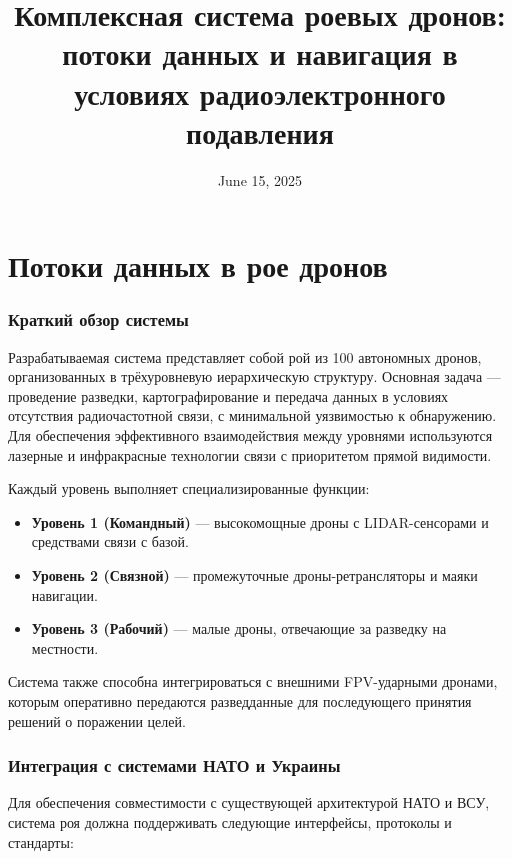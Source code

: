 \documentclass[12pt]{article}
\title{Комплексная система роевых дронов: потоки данных и навигация в условиях радиоэлектронного подавления}
\author{}
\date{June 15, 2025}
\begin{document}
\maketitle

\tableofcontents
\newpage

\part{Потоки данных в рое дронов}

\section{Краткий обзор системы}

Разрабатываемая система представляет собой рой из 100 автономных дронов, организованных в трёхуровневую иерархическую структуру. Основная задача --- проведение разведки, картографирование и передача данных в условиях отсутствия радиочастотной связи, с минимальной уязвимостью к обнаружению. Для обеспечения эффективного взаимодействия между уровнями используются лазерные и инфракрасные технологии связи с приоритетом прямой видимости. 

Каждый уровень выполняет специализированные функции:
\begin{itemize}
    \item \textbf{Уровень 1 (Командный)} --- высокомощные дроны с LIDAR-сенсорами и средствами связи с базой.
    \item \textbf{Уровень 2 (Связной)} --- промежуточные дроны-ретрансляторы и маяки навигации.
    \item \textbf{Уровень 3 (Рабочий)} --- малые дроны, отвечающие за разведку на местности.
\end{itemize}

Система также способна интегрироваться с внешними FPV-ударными дронами, которым оперативно передаются разведданные для последующего принятия решений о поражении целей.

\section{Интеграция с системами НАТО и Украины}

Для обеспечения совместимости с существующей архитектурой НАТО и ВСУ, система роя должна поддерживать следующие интерфейсы, протоколы и стандарты:
\end{document}
